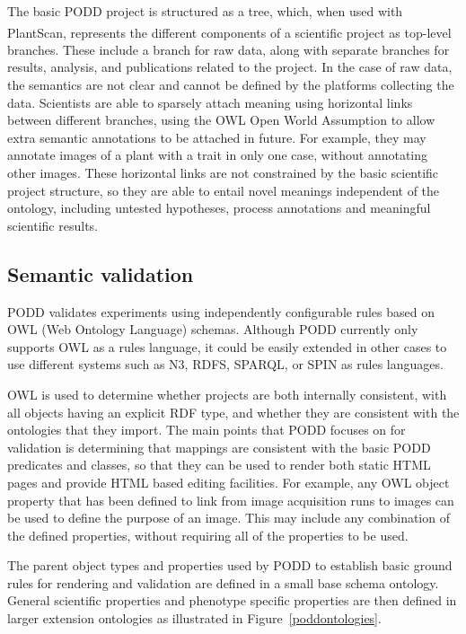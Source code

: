 \documentclass{llncs}
\begin{document}
The basic PODD project is structured as a tree, which, when used with
PlantScan\textsuperscript{\texttrademark}, represents the different components of a scientific project as
top-level branches. These include a branch for raw data, along with separate
branches for results, analysis, and publications related to the project. In the
case of raw data, the semantics are not clear and cannot be defined by the
platforms collecting the data. Scientists are able to sparsely attach meaning
using horizontal links between different branches, using the OWL Open World
Assumption to allow extra semantic annotations to be attached in future. For
example, they may annotate images of a plant with a trait in only one case,
without annotating other images. These horizontal links are not constrained by
the basic scientific project structure, so they are able to entail novel
meanings independent of the ontology, including untested hypotheses, process
annotations and meaningful scientific results.


\subsection{Semantic validation}
PODD validates experiments using independently configurable rules based on OWL
(Web Ontology Language) schemas. Although PODD currently only supports OWL as a
rules language, it could be easily extended in other cases to use different
systems such as N3, RDFS, SPARQL, or SPIN as rules languages. 


OWL is used to determine whether projects are both internally consistent, with
all objects having an explicit RDF type, and whether they are consistent with
the ontologies that they import. The main points that PODD focuses on for
validation is determining that mappings are consistent with the basic PODD
predicates and classes, so that they can be used to render both static HTML
pages and provide HTML based editing facilities. For example, any OWL object
property that has been defined to link from image acquisition runs to images can
be used to define the purpose of an image. This may include any combination of
the defined properties, without requiring all of the properties to be used.


The parent object types and properties used by PODD to establish basic ground
rules for rendering and validation are defined in a small base schema ontology.
General scientific properties and phenotype specific properties are then defined
in larger extension ontologies as illustrated in Figure~\ref{poddontologies}.
\end{document}
